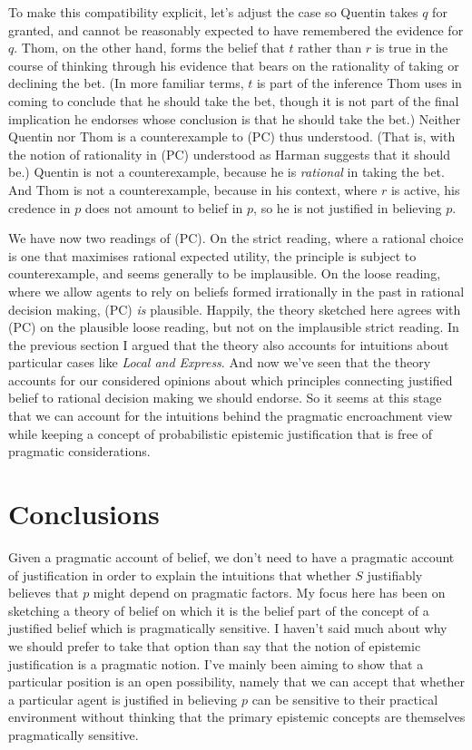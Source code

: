 To make this compatibility explicit, let's adjust the case so Quentin takes \(q\) for granted, and cannot be reasonably expected to have remembered the evidence for \(q\). Thom, on the other hand, forms the belief that \(t\) rather than \(r\) is true in the course of thinking through his evidence that bears on the rationality of taking or declining the bet. (In more familiar terms, \(t\) is part of the inference Thom uses in coming to conclude that he should take the bet, though it is not part of the final implication he endorses whose conclusion is that he should take the bet.) Neither Quentin nor Thom is a counterexample to (PC) thus understood. (That is, with the notion of rationality in (PC) understood as Harman suggests that it should be.) Quentin is not a counterexample, because he is \textit{rational} in taking the bet. And Thom is not a counterexample, because in his context, where \(r\) is active, his credence in \(p\) does not amount to belief in \(p\), so he is not justified in believing \(p\).

We have now two readings of (PC). On the strict reading, where a rational choice is one that maximises rational expected utility, the principle is subject to counterexample, and seems generally to be implausible. On the loose reading, where we allow agents to rely on beliefs formed irrationally in the past in rational decision making, (PC) \textit{is} plausible. Happily, the theory sketched here agrees with (PC) on the plausible loose reading, but not on the implausible strict reading. In the previous section I argued that the theory also accounts for intuitions about particular cases like \textit{Local and Express}. And now we've seen that the theory accounts for our considered opinions about which principles connecting justified belief to rational decision making we should endorse. So it seems at this stage that we can account for the intuitions behind the pragmatic encroachment view while keeping a concept of probabilistic epistemic justification that is free of pragmatic considerations.

\section{Conclusions}

Given a pragmatic account of belief, we don't need to have a pragmatic account of justification in order to explain the intuitions that whether \(S\)  justifiably believes that \(p\) might depend on pragmatic factors. My focus here has been on sketching a theory of belief on which it is the belief part of the concept of a justified belief which is pragmatically sensitive. I haven't said much about why we should prefer to take that option than say that the notion of epistemic justification is a pragmatic notion. I've mainly been aiming to show that a particular position is an open possibility, namely that we can accept that whether a particular agent is justified in believing \(p\) can be sensitive to their practical environment without thinking that the primary epistemic concepts are themselves pragmatically sensitive.

